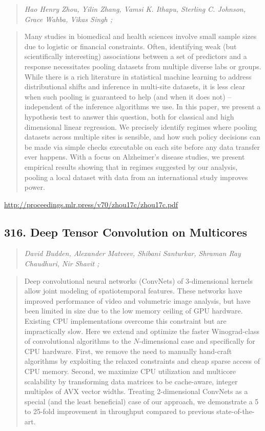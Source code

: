 \documentclass{article}
\begin{document}
\begin{quote}
\footnotesize{\textit{Hao Henry Zhou, Yilin Zhang, Vamsi K. Ithapu, Sterling C. Johnson, Grace Wahba, Vikas Singh ;}}
\end{quote}

\begin{quote}
    Many studies in biomedical and health sciences involve small sample sizes due to logistic or financial constraints. Often, identifying weak (but scientifically interesting) associations between a set of predictors and a response necessitates pooling datasets from multiple diverse labs or groups. While there is a rich literature in statistical machine learning to address distributional shifts and inference in multi-site datasets, it is less clear when such pooling is guaranteed to help (and when it does not) – independent of the inference algorithms we use. In this paper, we present a hypothesis test to answer this question, both for classical and high dimensional linear regression. We precisely identify regimes where pooling datasets across multiple sites is sensible, and how such policy decisions can be made via simple checks executable on each site before any data transfer ever happens. With a focus on Alzheimer’s disease studies, we present empirical results showing that in regimes suggested by our analysis, pooling a local dataset with data from an international study improves power.  \end{quote}

\href{http://proceedings.mlr.press/v70/zhou17c/zhou17c.pdf}{http://proceedings.mlr.press/v70/zhou17c/zhou17c.pdf}

\subsection{316. Deep Tensor Convolution on Multicores}

\begin{quote}
\footnotesize{\textit{David Budden, Alexander Matveev, Shibani Santurkar, Shraman Ray Chaudhuri, Nir Shavit ;}}
\end{quote}

\begin{quote}
    Deep convolutional neural networks (ConvNets) of 3-dimensional kernels allow joint modeling of spatiotemporal features. These networks have improved performance of video and volumetric image analysis, but have been limited in size due to the low memory ceiling of GPU hardware. Existing CPU implementations overcome this constraint but are impractically slow. Here we extend and optimize the faster Winograd-class of convolutional algorithms to the $N$-dimensional case and specifically for CPU hardware. First, we remove the need to manually hand-craft algorithms by exploiting the relaxed constraints and cheap sparse access of CPU memory. Second, we maximize CPU utilization and multicore scalability by transforming data matrices to be cache-aware, integer multiples of AVX vector widths. Treating 2-dimensional ConvNets as a special (and the least beneficial) case of our approach, we demonstrate a 5 to 25-fold improvement in throughput compared to previous state-of-the-art.  \end{quote}
\end{document}

